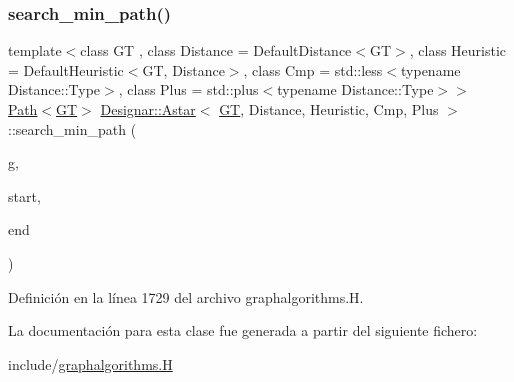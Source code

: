 \subsubsection{\texorpdfstring{search\+\_\+min\+\_\+path()}{search\_min\_path()}}
{\footnotesize\ttfamily template$<$class GT , class Distance  = Default\+Distance$<$\+G\+T$>$, class Heuristic  = Default\+Heuristic$<$\+G\+T, Distance$>$, class Cmp  = std\+::less$<$typename Distance\+::\+Type$>$, class Plus  = std\+::plus$<$typename Distance\+::\+Type$>$$>$ \\
\hyperlink{class_designar_1_1_path}{Path}$<$\hyperlink{demo-buildgraph_8_c_a3001c40d2c31ca87ed96cd7d1334a55e}{GT}$>$ \hyperlink{class_designar_1_1_astar}{Designar\+::\+Astar}$<$ \hyperlink{demo-buildgraph_8_c_a3001c40d2c31ca87ed96cd7d1334a55e}{GT}, Distance, Heuristic, Cmp, Plus $>$\+::search\+\_\+min\+\_\+path (\begin{DoxyParamCaption}\item[{\hyperlink{demo-buildgraph_8_c_a3001c40d2c31ca87ed96cd7d1334a55e}{GT} \&}]{g,  }\item[{\hyperlink{class_designar_1_1_astar_a0d4cdf6b94255824c6c93e5ae18e9eb7}{Node} \&}]{start,  }\item[{\hyperlink{class_designar_1_1_astar_a0d4cdf6b94255824c6c93e5ae18e9eb7}{Node} \&}]{end }\end{DoxyParamCaption})\hspace{0.3cm}{\ttfamily [inline]}}



Definición en la línea 1729 del archivo graphalgorithms.\+H.



La documentación para esta clase fue generada a partir del siguiente fichero\+:\begin{DoxyCompactItemize}
\item 
include/\hyperlink{graphalgorithms_8_h}{graphalgorithms.\+H}\end{DoxyCompactItemize}
